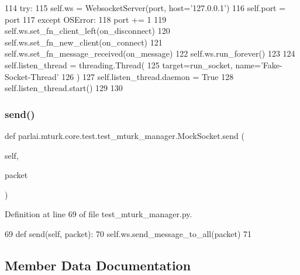\begin{DoxyCode}
114                 \textcolor{keywordflow}{try}:
115                     self.ws = WebsocketServer(port, host=\textcolor{stringliteral}{'127.0.0.1'})
116                     self.port = port
117                 \textcolor{keywordflow}{except} OSError:
118                     port += 1
119             self.ws.set\_fn\_client\_left(on\_disconnect)
120             self.ws.set\_fn\_new\_client(on\_connect)
121             self.ws.set\_fn\_message\_received(on\_message)
122             self.ws.run\_forever()
123 
124         self.listen\_thread = threading.Thread(
125             target=run\_socket, name=\textcolor{stringliteral}{'Fake-Socket-Thread'}
126         )
127         self.listen\_thread.daemon = \textcolor{keyword}{True}
128         self.listen\_thread.start()
129 
130 
\end{DoxyCode}
\mbox{\label{classparlai_1_1mturk_1_1core_1_1test_1_1test__mturk__manager_1_1MockSocket_a2c9e08630bf5b3d476aac4411c22f096}} 
\subsubsection{\texorpdfstring{send()}{send()}}
{\footnotesize\ttfamily def parlai.\+mturk.\+core.\+test.\+test\+\_\+mturk\+\_\+manager.\+Mock\+Socket.\+send (\begin{DoxyParamCaption}\item[{}]{self,  }\item[{}]{packet }\end{DoxyParamCaption})}



Definition at line 69 of file test\+\_\+mturk\+\_\+manager.\+py.


\begin{DoxyCode}
69     \textcolor{keyword}{def }send(self, packet):
70         self.ws.send\_message\_to\_all(packet)
71 
\end{DoxyCode}


\subsection{Member Data Documentation}
\mbox{\label{classparlai_1_1mturk_1_1core_1_1test_1_1test__mturk__manager_1_1MockSocket_a7d23d7e646c285d2fbf728cd5a789b14}} 
